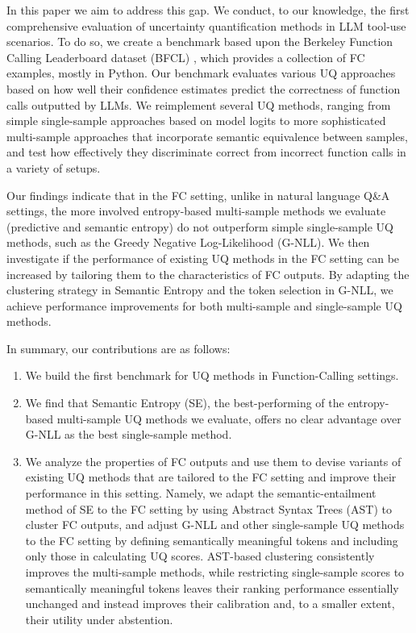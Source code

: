 In this paper we aim to address this gap. We  conduct, to our knowledge, the first comprehensive evaluation of uncertainty quantification methods in LLM tool-use scenarios. 
To do so, we create a benchmark based upon the Berkeley Function Calling Leaderboard dataset (BFCL) \citep{bfcl}, which provides a collection of FC examples, mostly in Python.
Our benchmark evaluates various UQ approaches based on how well their confidence estimates predict the correctness of function calls outputted by LLMs.
We reimplement several UQ methods, ranging from simple single-sample approaches based on model logits to more sophisticated multi-sample approaches that incorporate semantic equivalence between samples, and test how effectively they discriminate correct from incorrect function calls in a variety of setups.

Our findings indicate that in the FC setting, unlike in natural language Q\&A settings, the more involved entropy-based multi-sample methods we evaluate (predictive and semantic entropy) do not outperform simple single-sample UQ methods, such as the Greedy Negative Log-Likelihood (G-NLL).
We then investigate if the performance of existing UQ methods in the FC setting can be increased by tailoring them to the characteristics of FC outputs. By adapting the clustering strategy in Semantic Entropy and the token selection in G-NLL, we achieve performance improvements for both multi-sample and single-sample UQ methods.



\noindent In summary, our contributions are as follows:
\begin{enumerate}[leftmargin=*, topsep=0pt, itemsep=2pt, partopsep=0pt, parsep=0pt]
    \item We build the first benchmark for UQ methods in Function-Calling settings. 
    \item We find that
    Semantic Entropy (SE), the best-performing of the entropy-based multi-sample UQ methods we evaluate, offers no clear advantage over G-NLL as the best single-sample method.
    \item We analyze the properties of FC outputs
    and use them to devise variants of existing UQ methods that are tailored to the FC setting and improve their performance in this setting. Namely, we adapt the semantic-entailment method of SE to the FC setting by using Abstract Syntax Trees (AST) to cluster FC outputs, and adjust G-NLL and other single-sample UQ methods to the FC setting by defining semantically meaningful tokens and including only those in  calculating UQ scores. AST-based clustering consistently improves the multi-sample methods, while restricting single-sample scores to semantically meaningful tokens leaves their ranking performance essentially unchanged and instead improves their calibration and, to a smaller extent, their utility under abstention.
\end{enumerate}

